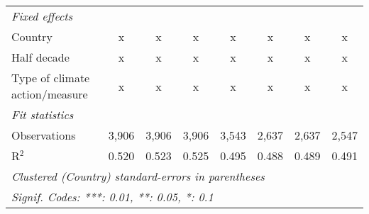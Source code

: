 \begin{table}[htbp]
\begin{tabular}{lccccccc}
      \emph{Fixed effects}\\
      Country                                                                            & x              & x              & x              & x              & x             & x             & x\\  
      Half decade                                                                        & x              & x              & x              & x              & x             & x             & x\\  
      Type of climate action/measure                                                     & x              & x              & x              & x              & x             & x             & x\\  
      \midrule \emph{Fit statistics}\\
      Observations                                                                       & 3,906          & 3,906          & 3,906          & 3,543          & 2,637         & 2,637         & 2,547\\  
      R$^2$                                                                              & 0.520          & 0.523          & 0.525          & 0.495          & 0.488         & 0.489         & 0.491\\  
      \midrule
      \multicolumn{8}{l}{\emph{Clustered (Country) standard-errors in parentheses}}\\
      \multicolumn{8}{l}{\emph{Signif. Codes: ***: 0.01, **: 0.05, *: 0.1}}\\
   \end{tabular}
\end{table}


